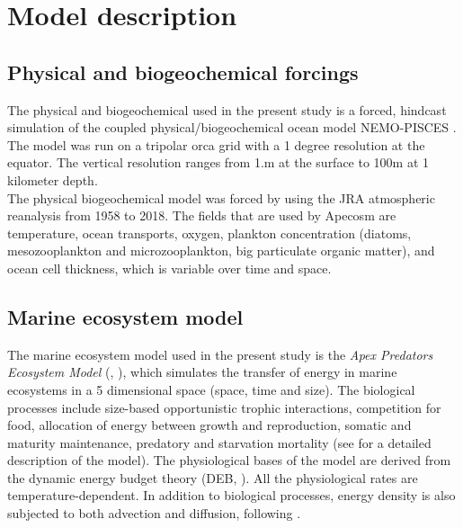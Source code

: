\section{Model description}

\subsection{Physical and biogeochemical forcings}

The physical and biogeochemical used in the present study is a forced, hindcast simulation of the coupled physical/biogeochemical 
ocean model NEMO-PISCES \citep{aumontPISCESv2OceanBiogeochemical2015}. The model was run on a tripolar orca grid \citep{madecGlobalOceanMesh1996} with a
1 degree resolution at the equator. The vertical resolution ranges from 1.m at the surface to 100m at 1 kilometer depth. \\

The physical biogeochemical model was forced by using the JRA atmospheric reanalysis \citep{kobayashiJRA55ReanalysisGeneral2015} from 1958 to 2018.
The fields that are used by Apecosm are temperature, ocean transports, 
oxygen, plankton concentration (diatoms, mesozooplankton and microzooplankton, big particulate organic matter), 
\ppar and ocean cell thickness, which is variable over time and space.\\


\subsection{Marine ecosystem model}

The marine ecosystem model used in the present study is the \emph{Apex Predators Ecosystem Model} (\ap, \citealt{mauryModelingEnvironmentalEffects2007,mauryOverviewAPECOSMSpatialized2010}), which simulates 
the transfer of energy in marine ecosystems in a 5 dimensional space (space, time and size).
The biological processes include size-based opportunistic trophic interactions, competition for food, allocation of energy between growth and reproduction, somatic and maturity maintenance, predatory and starvation mortality (see \citealt{mauryModelingEnvironmentalEffects2007} for a detailed description of the model).
The physiological bases of the model are derived from the dynamic energy budget theory (DEB, \citealt{kooijmanDynamicEnergyMass2000}).
All the physiological rates are temperature-dependent.  In addition to biological processes, energy density 
is also subjected to both advection and diffusion, following \cite{faugerasAdvectiondiffusionreactionSizestructuredFish2005}.\\

